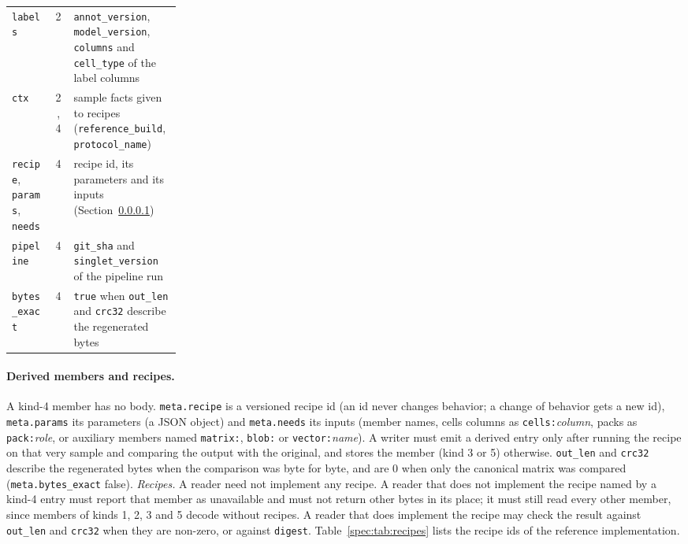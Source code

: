 \begin{table}[htbp]
\begin{tabularx}{\linewidth}{@{}>{\raggedright\arraybackslash}p{0.25\linewidth}cX@{}}
\texttt{labels} & 2 & \texttt{annot\_version}, \texttt{model\_version}, \texttt{columns} and \texttt{cell\_type} of the label columns \\
\texttt{ctx} & 2, 4 & sample facts given to recipes (\texttt{reference\_build}, \texttt{protocol\_name}) \\
\texttt{recipe}, \texttt{params}, \texttt{needs} & 4 & recipe id, its parameters and its inputs (Section~\ref{spec:derived}) \\
\texttt{pipeline} & 4 & \texttt{git\_sha} and \texttt{singlet\_version} of the pipeline run \\
\texttt{bytes\_exact} & 4 & \texttt{true} when \texttt{out\_len} and \texttt{crc32} describe the regenerated bytes \\
\bottomrule
\end{tabularx}
\end{table}

\paragraph{Derived members and recipes.}
\label{spec:derived}
A kind-4 member has no body. \texttt{meta.recipe} is a versioned recipe id (an id never changes behavior; a change of
behavior gets a new id), \texttt{meta.params} its parameters (a JSON object) and \texttt{meta.needs} its inputs (member
names, cells columns as \texttt{cells:}\emph{column}, packs as \texttt{pack:}\emph{role}, or auxiliary members named
\texttt{matrix:}, \texttt{blob:} or \texttt{vector:}\emph{name}). A writer must emit a derived entry only after running
the recipe on that very sample and comparing the output with the original, and stores the member (kind 3 or 5)
otherwise. \texttt{out\_len} and \texttt{crc32} describe the regenerated bytes when the comparison was byte for byte, and
are 0 when only the canonical matrix was compared (\texttt{meta.bytes\_exact} false).
\emph{Recipes.} A reader need not implement any recipe. A reader that does not implement the recipe named by a kind-4 entry must report that
member as unavailable and must not return other bytes in its place; it must still read every other member, since members
of kinds 1, 2, 3 and 5 decode without recipes. A reader that does implement the recipe may check the result against
\texttt{out\_len} and \texttt{crc32} when they are non-zero, or against \texttt{digest}.
Table~\ref{spec:tab:recipes} lists the recipe ids of the reference implementation.

